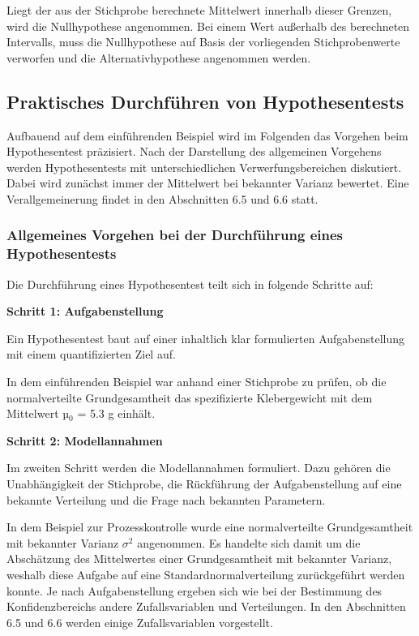 \noindent Liegt der aus der Stichprobe berechnete Mittelwert innerhalb dieser Grenzen, wird die Nullhypothese angenommen. Bei einem Wert au{\ss}erhalb des berechneten Intervalls, muss die Nullhypothese auf Basis der vorliegenden Stichprobenwerte verworfen und die Alternativhypothese angenommen werden.

\clearpage

\subsection{Praktisches Durchf\"{u}hren von Hypothesentests}

\noindent Aufbauend auf dem einf\"{u}hrenden Beispiel wird im Folgenden das Vorgehen beim Hypothesentest pr\"{a}zisiert. Nach der Darstellung des allgemeinen Vorgehens werden Hypothesentests mit unterschiedlichen Verwerfungsbereichen diskutiert. Dabei wird zun\"{a}chst immer der Mittelwert bei bekannter Varianz bewertet. Eine Verallgemeinerung findet in den Abschnitten 6.5 und 6.6 statt.

\subsubsection{Allgemeines Vorgehen bei der Durchf\"{u}hrung eines Hypothesentests}

\noindent Die Durchf\"{u}hrung eines Hypothesentest teilt sich in folgende Schritte auf:\bigskip

{\selectfont
\noindent\textbf{Schritt 1: Aufgabenstellung}}\smallskip

\noindent Ein Hypothesentest baut auf einer inhaltlich klar formulierten Aufgabenstellung mit einem quantifizierten Ziel auf.\newline

\noindent In dem einf\"{u}hrenden Beispiel war anhand einer Stichprobe zu pr\"{u}fen, ob die normalverteilte Grundgesamtheit das spezifizierte Klebergewicht mit dem Mittelwert µ$_{0}$ = 5.3 g einh\"{a}lt.\bigskip

{\selectfont
\noindent\textbf{Schritt 2: Modellannahmen}}\smallskip

\noindent Im zweiten Schritt werden die Modellannahmen formuliert. Dazu geh\"{o}ren die Unabh\"{a}ngigkeit der Stichprobe, die R\"{u}ckf\"{u}hrung der Aufgabenstellung auf eine bekannte Verteilung und die Frage nach bekannten Parametern.\newline

\noindent In dem Beispiel zur Prozesskontrolle wurde eine normalverteilte Grundgesamtheit mit bekannter Varianz $\sigma^{2}$ angenommen. Es handelte sich damit um die Absch\"{a}tzung des Mittelwertes einer Grundgesamtheit mit bekannter Varianz, weshalb diese Aufgabe auf eine Standardnormalverteilung zur\"{u}ckgef\"{u}hrt werden konnte. Je nach Aufgabenstellung ergeben sich wie bei der Bestimmung des Konfidenzbereichs andere Zufallsvariablen und Verteilungen. In den Abschnitten 6.5 und 6.6 werden einige Zufallsvariablen vorgestellt.\bigskip

